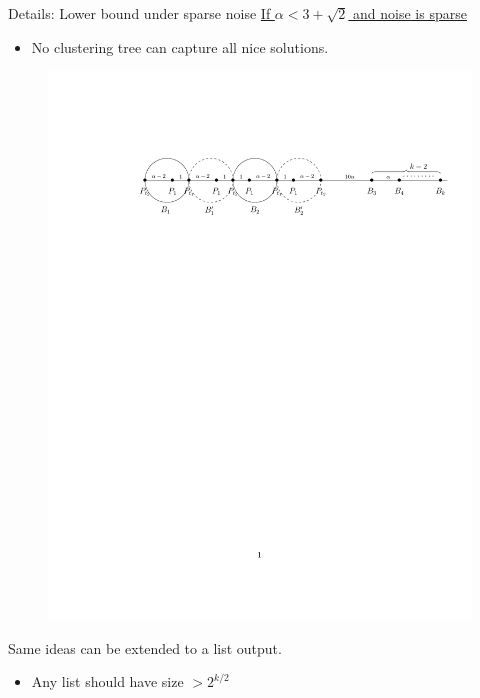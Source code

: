 \documentclass{beamer}
\begin{document}
\begin{frame}[label=detailsNegativeSparseNoise]{Details: Lower bound under sparse noise}
	\hyperlink{negativeSparseNoise}{If $\alpha < 3 + \sqrt{2}$ and noise is sparse}
	\begin{itemize}
		\item No clustering tree can capture all nice solutions.
	\end{itemize}
	
	\vspace{20pt}\begin{figure}[!t]
	  \begin{center}
	    \includegraphics[trim={47mm 205mm 12mm 44mm},clip,width=\textwidth]{figures/clusteringNoise/lbdFig2.pdf}
	  \end{center}
	\end{figure}
	\vspace{20pt}Same ideas can be extended to a list output.\\
	\begin{itemize}
		\item Any list should have size $> 2^{k/2}$
	\end{itemize}
\end{frame}
\end{document}
